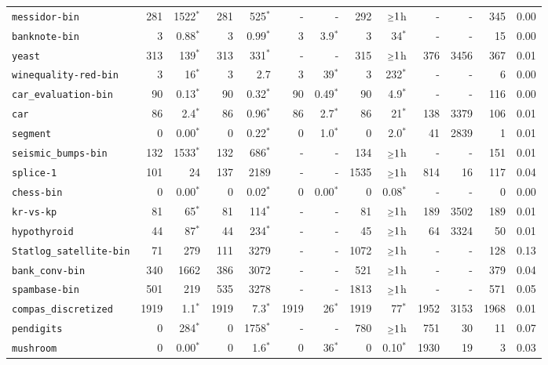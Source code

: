 \begin{tabular}{lrrrrrrrrrrrr}
\texttt{messidor-bin} & 281 & 1522$^*$ & 281 & 525$^*$ & - & - & 292 & $\mathsmaller{\geq}1$h & - & - & 345 & 0.00\\
\texttt{banknote-bin} & 3 & 0.88$^*$ & 3 & 0.99$^*$ & 3 & 3.9$^*$ & 3 & 34$^*$ & - & - & 15 & 0.00\\
\texttt{yeast} & 313 & 139$^*$ & 313 & 331$^*$ & - & - & 315 & $\mathsmaller{\geq}1$h & 376 & 3456 & 367 & 0.01\\
\texttt{winequality-red-bin} & 3 & 16$^*$ & 3 & 2.7 & 3 & 39$^*$ & 3 & 232$^*$ & - & - & 6 & 0.00\\
\texttt{car\_evaluation-bin} & 90 & 0.13$^*$ & 90 & 0.32$^*$ & 90 & 0.49$^*$ & 90 & 4.9$^*$ & - & - & 116 & 0.00\\
\texttt{car} & 86 & 2.4$^*$ & 86 & 0.96$^*$ & 86 & 2.7$^*$ & 86 & 21$^*$ & 138 & 3379 & 106 & 0.01\\
\texttt{segment} & 0 & 0.00$^*$ & 0 & 0.22$^*$ & 0 & 1.0$^*$ & 0 & 2.0$^*$ & 41 & 2839 & 1 & 0.01\\
\texttt{seismic\_bumps-bin} & 132 & 1533$^*$ & 132 & 686$^*$ & - & - & 134 & $\mathsmaller{\geq}1$h & - & - & 151 & 0.01\\
\texttt{splice-1} & 101 & 24 & 137 & 2189 & - & - & 1535 & $\mathsmaller{\geq}1$h & 814 & 16 & 117 & 0.04\\
\texttt{chess-bin} & 0 & 0.00$^*$ & 0 & 0.02$^*$ & 0 & 0.00$^*$ & 0 & 0.08$^*$ & - & - & 0 & 0.00\\
\texttt{kr-vs-kp} & 81 & 65$^*$ & 81 & 114$^*$ & - & - & 81 & $\mathsmaller{\geq}1$h & 189 & 3502 & 189 & 0.01\\
\texttt{hypothyroid} & 44 & 87$^*$ & 44 & 234$^*$ & - & - & 45 & $\mathsmaller{\geq}1$h & 64 & 3324 & 50 & 0.01\\
\texttt{Statlog\_satellite-bin} & 71 & 279 & 111 & 3279 & - & - & 1072 & $\mathsmaller{\geq}1$h & - & - & 128 & 0.13\\
\texttt{bank\_conv-bin} & 340 & 1662 & 386 & 3072 & - & - & 521 & $\mathsmaller{\geq}1$h & - & - & 379 & 0.04\\
\texttt{spambase-bin} & 501 & 219 & 535 & 3278 & - & - & 1813 & $\mathsmaller{\geq}1$h & - & - & 571 & 0.05\\
\texttt{compas\_discretized} & 1919 & 1.1$^*$ & 1919 & 7.3$^*$ & 1919 & 26$^*$ & 1919 & 77$^*$ & 1952 & 3153 & 1968 & 0.01\\
\texttt{pendigits} & 0 & 284$^*$ & 0 & 1758$^*$ & - & - & 780 & $\mathsmaller{\geq}1$h & 751 & 30 & 11 & 0.07\\
\texttt{mushroom} & 0 & 0.00$^*$ & 0 & 1.6$^*$ & 0 & 36$^*$ & 0 & 0.10$^*$ & 1930 & 19 & 3 & 0.03\\

\end{tabular}
